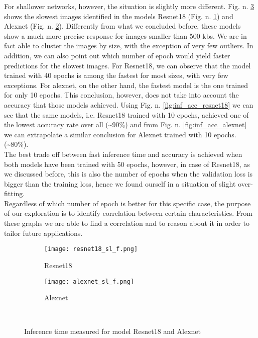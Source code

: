 For shallower networks, however, the situation is slightly more different. Fig. n. \ref{fig:sl_f_shallow} shows the slowest images identified in the models Resnet18 (Fig. n. \ref{fig:resnet18_sl_f}) and Alexnet (Fig. n. \ref{fig:alexnet_sl_f}). Differently from what we concluded before, these models show a much more precise response for images smaller than 500 kbs. We are in fact able to cluster the images by size, with the exception of very few outliers. In addition, we can also point out which number of epoch would yield faster predictions for the slowest images. For Resnet18, we can observe that the model trained with 40 epochs is among the fastest for most sizes, with very few exceptions. For alexnet, on the other hand, the fastest model is the one trained for only 10 epochs. This conclusion, however, does not take into account the accuracy that those models achieved. Using Fig. n. \ref{fig:inf_acc_resnet18} we can see that the same models, i.e. Resnet18 trained with 10 epochs, achieved one of the lowest accuracy rate over all (\textasciitilde90\%) and from Fig. n. \ref{fig:inf_acc_alexnet} we can extrapolate a similar conclusion for Alexnet trained with 10 epochs.(\textasciitilde80\%). \\
The best trade off between fast inference time and accuracy is achieved when both models have been trained with 50 epochs, however, in case of Resnet18, as we discussed before, this is also the number of epochs when the validation loss is bigger than the training loss, hence we found ourself in a situation of slight over-fitting. \\
Regardless of which number of epoch is better for this specific case, the purpose of our exploration is to identify correlation between certain characteristics. From these graphs we are able to find a correlation and to reason about it in order to tailor future applications. 


\begin{figure}[h]
     \begin{subfigure}{0.5\textwidth}
	    \texttt{[image: resnet18\_sl\_f.png]}
	    \caption{Resnet18}
         \label{fig:resnet18_sl_f}
         
     \end{subfigure}
     \hfill
     \begin{subfigure}{0.5\textwidth}
	    \texttt{[image: alexnet\_sl\_f.png]}
	    \caption{Alexnet}
        \label{fig:alexnet_sl_f}
        
     \end{subfigure}\\
     \caption{Inference time measured for model Resnet18 and Alexnet}
        \label{fig:sl_f_shallow}
\end{figure}


